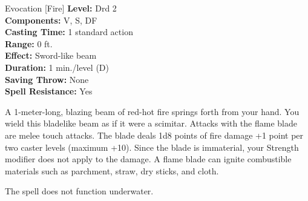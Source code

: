 {Evocation [Fire]}
{
	\textbf{Level:}
	Drd 2\\
	\textbf{Components:}
	V, S, DF\\
	\textbf{Casting Time:}
	1 standard action\\
	\textbf{Range:}
	0 ft.\\
	\textbf{Effect:}
	Sword-like beam\\
	\textbf{Duration:}
	1 min./level (D)\\
	\textbf{Saving Throw:}
	None\\
	\textbf{Spell Resistance:}
	Yes\\
}
{
	A 1-meter-long, blazing beam of red-hot fire springs forth from your hand. You wield this bladelike beam as if it were a scimitar. Attacks with the flame blade are melee touch attacks. The blade deals 1d8 points of fire damage +1 point per two caster levels (maximum +10). Since the blade is immaterial, your Strength modifier does not apply to the damage. A flame blade can ignite combustible materials such as parchment, straw, dry sticks, and cloth.

	The spell does not function underwater.

}
